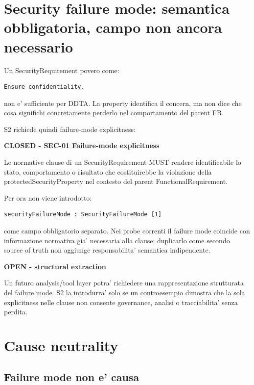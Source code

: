\documentclass[11pt,a4paper]{article}
\newcommand{\closed}{\textbf{CLOSED}}
\newenvironment{statusbox}[1]{%
  \def\FrameCommand{\fcolorbox{ddtablue}{ddtagray}}%
  \MakeFramed{\advance\hsize-2\width\FrameRestore}
  \noindent\textbf{#1}\par\smallskip
}{\endMakeFramed}
\newenvironment{resultbox}[1]{%
  \def\FrameCommand{\fcolorbox{ddtagreen}{ddtagray}}%
  \MakeFramed{\advance\hsize-2\width\FrameRestore}
  \noindent\textbf{#1}\par\smallskip
}{\endMakeFramed}
\begin{document}
\section{Security failure mode: semantica obbligatoria, campo non ancora necessario}

Un SecurityRequirement povero come:

\begin{lstlisting}
Ensure confidentiality.
\end{lstlisting}

non e' sufficiente per DDTA. La property identifica il concern, ma non dice che cosa significhi concretamente perderlo nel comportamento del parent FR.

S2 richiede quindi failure-mode explicitness:

\begin{resultbox}{\closed{} - SEC-01 Failure-mode explicitness}
Le normative clause di un SecurityRequirement MUST rendere identificabile lo stato, comportamento o risultato che costituirebbe la violazione della protectedSecurityProperty nel contesto del parent FunctionalRequirement.
\end{resultbox}

Per ora non viene introdotto:

\begin{lstlisting}
securityFailureMode : SecurityFailureMode [1]
\end{lstlisting}

come campo obbligatorio separato. Nei probe correnti il failure mode coincide con informazione normativa gia' necessaria alla clause; duplicarlo come secondo source of truth non aggiunge responsabilita' semantica indipendente.

\begin{statusbox}{OPEN - structural extraction}
Un futuro analysis/tool layer potra' richiedere una rappresentazione strutturata del failure mode. S2 la introdurra' solo se un controesempio dimostra che la sola explicitness nelle clause non consente governance, analisi o tracciabilita' senza perdita.
\end{statusbox}

\section{Cause neutrality}

\subsection{Failure mode non e' causa}
\end{document}
